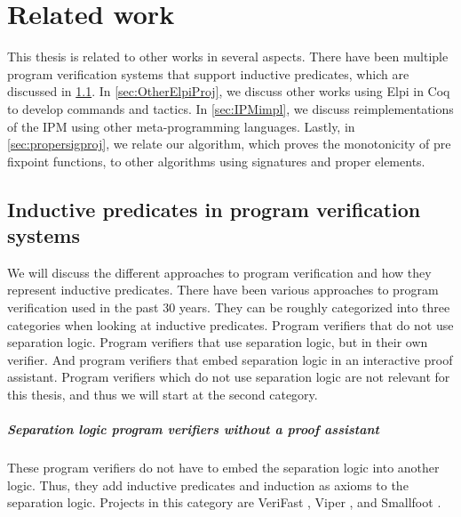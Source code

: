 \documentclass[thesis.tex]{subfiles}
\begin{document}
\VerbatimFootnotes

\chapter{Related work} \label{ch:relatedwork}
This thesis is related to other works in several aspects. There have been multiple program verification systems that support inductive predicates, which are discussed in \cref{sec:othersfs}. In \cref{sec:OtherElpiProj}, we discuss other works using Elpi in Coq to develop commands and tactics. In \cref{sec:IPMimpl}, we discuss reimplementations of the IPM using other meta-programming languages. Lastly, in \cref{sec:propersigproj}, we relate our algorithm, which proves the monotonicity of pre fixpoint functions, to other algorithms using signatures and proper elements.

\section{Inductive predicates in program verification systems}\label{sec:othersfs}
We will discuss the different approaches to program verification and how they represent inductive predicates.
There have been various approaches to program verification used in the past 30 years. They can be roughly categorized into three categories when looking at inductive predicates. Program verifiers that do not use separation logic. Program verifiers that use separation logic, but in their own verifier. And program verifiers that embed separation logic in an interactive proof assistant. Program verifiers which do not use separation logic are not relevant for this thesis, and thus we will start at the second category.

\paragraph{Separation logic program verifiers without a proof assistant}
These program verifiers do not have to embed the separation logic into another logic. Thus, they add inductive predicates and induction as axioms to the separation logic. Projects in this category are VeriFast \cite{jacobsVeriFastPowerfulSound2011}, Viper \cite{mullerViperVerificationInfrastructure2016,summersAutomatingDeductiveVerification2018}, and Smallfoot \cite{berdineSmallfootModularAutomatic2005}.
\end{document}
